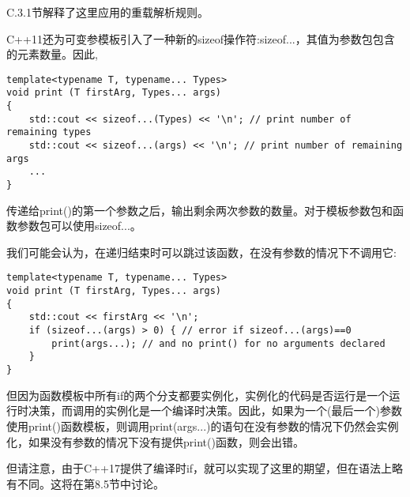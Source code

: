 C.3.1节解释了这里应用的重载解析规则。


C++11还为可变参模板引入了一种新的sizeof操作符:sizeof...，其值为参数包包含的元素数量。因此,

\begin{lstlisting}[style=styleCXX]
template<typename T, typename... Types>
void print (T firstArg, Types... args)
{
	std::cout << sizeof...(Types) << '\n'; // print number of remaining types
	std::cout << sizeof...(args) << '\n'; // print number of remaining args
	...
}
\end{lstlisting}

传递给print()的第一个参数之后，输出剩余两次参数的数量。对于模板参数包和函数参数包可以使用sizeof...。

我们可能会认为，在递归结束时可以跳过该函数，在没有参数的情况下不调用它:

\begin{lstlisting}[style=styleCXX]
template<typename T, typename... Types>
void print (T firstArg, Types... args)
{
	std::cout << firstArg << '\n';
	if (sizeof...(args) > 0) { // error if sizeof...(args)==0
		print(args...); // and no print() for no arguments declared
	}
}
\end{lstlisting}

但因为函数模板中所有if的两个分支都要实例化，实例化的代码是否运行是一个运行时决策，而调用的实例化是一个编译时决策。因此，如果为一个(最后一个)参数使用print()函数模板，则调用print(args...)的语句在没有参数的情况下仍然会实例化，如果没有参数的情况下没有提供print()函数，则会出错。

但请注意，由于C++17提供了编译时if，就可以实现了这里的期望，但在语法上略有不同。这将在第8.5节中讨论。
























